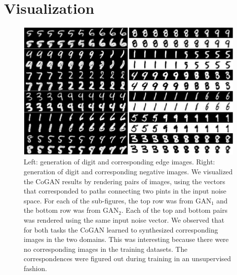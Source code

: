 \section{Visualization}\label{subsec::dual_vis}


\begin{figure}[tbh!]
\centering
\includegraphics[trim=0.0in 0.0in 0.0in 0in, width=1.0\textwidth]{result_mnist.pdf}
\caption{Left: generation of digit and corresponding edge images. Right: generation of digit and corresponding negative images. We visualized the CoGAN results by rendering pairs of images, using the vectors that corresponded to paths connecting two pints in the input noise space. For each of the sub-figures, the top row was from $\text{GAN}_1$ and the bottom row was from $\text{GAN}_2$. Each of the top and bottom pairs was rendered using the same input noise vector. We observed that for both tasks the CoGAN learned to synthesized corresponding images in the two domains. This was interesting because there were no corresponding images in the training datasets. The correspondences were figured out during training in an unsupervised fashion.}
\label{fig::result_mnist_edge_vis}
\end{figure}

